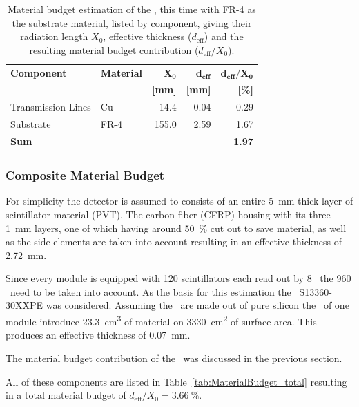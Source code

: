 \documentclass[../BTOF_summary.tex]{subfiles}
\begin{document}
\begin{table}[htbp]
\centering
\caption[Material budget estimation of the \railboard\ with FR-4 instead of Rogers Material.]{Material budget estimation of the \railboard , this time with FR-4 as the substrate material, listed by component, giving their radiation length $X_0$, effective thickness ($d_\text{eff}$) and the resulting material budget contribution ($d_{\text{eff}} / X_0$).}
\label{tab:MaterialBudget_RailboardFR4}
\begin{tabular}{@{}llrrr@{}}
\toprule
\textbf{Component} & \textbf{Material} & $\mathbf{X_0}$ & $\mathbf{d_{eff}}$ & $\mathbf{d_{eff}/X_{0}}$ \\
                   & \textbf{}         & \textbf{[mm]}  & \textbf{[mm]}      & \textbf{[\%]}            \\ \midrule
Transmission Lines & Cu       & 14.4  & 0.04 & 0.29          \\
Substrate		   & FR-4     & 155.0 & 2.59 & 1.67          \\ 
\midrule
\textbf{Sum} &    &   &      & \textbf{1.97} \\ \bottomrule
\end{tabular}
\end{table}

\subsubsection*{Composite Material Budget}
For simplicity the detector is assumed to consists of an entire \SI{5}{mm} thick layer of scintillator material (PVT).
The carbon fiber (CFRP) housing with its three \SI{1}{mm} layers, one of which having around \SI{50}{\percent} cut out to save material, as well as the side elements are taken into account resulting in an effective thickness of \SI{2.72}{mm}.

Since every module is equipped with 120 scintillators each read out by 8 \sipms\ the 960 \sipms\ need to be taken into account. As the basis for this estimation the \hamamatsu\ S13360-30XXPE was considered. %
Assuming the \sipms\ are made out of pure silicon the \sipms\ of one module introduce \SI{23.3}{cm^3} of material on \SI{3330}{cm^2} of surface area. This produces an effective thickness of \SI{0.07}{mm}.

The material budget contribution of the \railboard\ was discussed in the previous section.

All of these components are listed in Table~\ref{tab:MaterialBudget_total} resulting in a total material budget of $d_{\text{eff}} / X_0 = \SI{3.66}{\percent}$.
\end{document}
